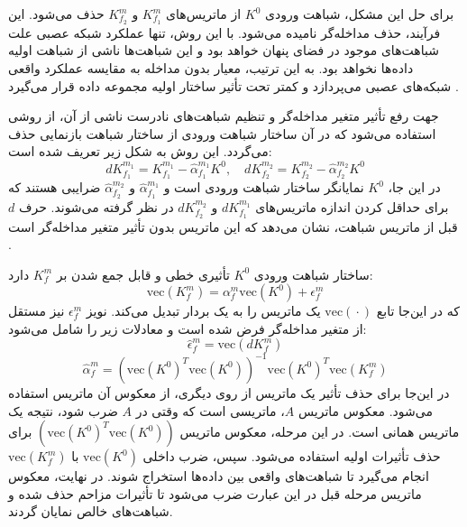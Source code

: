 برای حل این مشکل، شباهت ورودی \(K^0\) از ماتریس‌های \(K^{m}_{f_1}\) و \(K^{m}_{f_2}\) حذف می‌شود. این فرآیند، حذف مداخله‌گر نامیده می‌شود. با این روش، تنها عملکرد شبکه عصبی علت شباهت‌های موجود در فضای پنهان خواهد بود و این شباهت‌ها ناشی از شباهت اولیه داده‌ها نخواهد بود. به این ترتیب، معیار بدون مداخله به مقایسه عملکرد واقعی شبکه‌های عصبی می‌پردازد و کمتر تحت تأثیر ساختار اولیه مجموعه داده قرار می‌گیرد
\cite{cui2022deconfounded}.


جهت رفع تأثیر متغیر مداخله‌گر و تنظیم شباهت‌های نادرست ناشی از آن، از روشی استفاده می‌شود که در آن ساختار شباهت ورودی از ساختار شباهت بازنمایی حذف می‌گردد. این روش به شکل زیر تعریف شده است:
\begin{equation}
 dK^{m_1}_{f_1} = K^{m_1}_{f_1} - \hat{\alpha}^{m_1}_{f_1} K^0,  \quad
dK^{m_2}_{f_2} = K^{m_2}_{f_2} - \hat{\alpha}^{m_2}_{f_2} K^0
\end{equation}
در این جا، \(K^0\) نمایانگر ساختار شباهت ورودی است و \(\hat{\alpha}^{m_1}_{f_1}\) و \(\hat{\alpha}^{m_2}_{f_2}\) ضرایبی هستند که برای حداقل کردن اندازه‌ ماتریس‌های \(dK^{m_1}_{f_1}\) و \(dK^{m_2}_{f_2}\) در نظر گرفته می‌شوند. حرف \(d\) قبل از ماتریس شباهت، نشان می‌دهد که این ماتریس بدون تأثیر متغیر مداخله‌گر است
\cite{cui2022deconfounded}.

ساختار شباهت ورودی \(K^0\) تأثیری خطی و قابل جمع شدن بر \(K^{m}_{f}\) دارد:
\begin{equation}
	\text{vec}(K^{m}_{f}) = \alpha^{m}_{f} \text{vec}(K^0) + \epsilon^{m}_{f}
\end{equation}
که در این‌جا تابع \(\text{vec}(‎\cdot)\) یک ماتریس را به یک بردار تبدیل می‌کند. نویز \(\epsilon^{m}_{f}\) نیز مستقل از متغیر مداخله‌گر فرض شده است و معادلات زیر را شامل می‌شود:
\begin{equation}
	\hat{\epsilon}^{m}_{f} = \text{vec}(dK^{m}_{f})
\end{equation}
\vspace{-34}
\begin{equation}
	\hat{\alpha}^{m}_{f} = (\text{vec}(K^0)^T \text{vec}(K^0))^{-1} \text{vec}(K^0)^T \text{vec}(K^{m}_{f})
\end{equation}
در این‌جا برای حذف تأثیر یک ماتریس از روی دیگری، از معکوس آن ماتریس استفاده می‌شود. معکوس ماتریس \(A\)، ماتریسی است که وقتی در \(A\) ضرب شود، نتیجه یک ماتریس همانی%
است.
در این مرحله، معکوس ماتریس \((\text{vec}(K^0)^T \text{vec}(K^0))\) برای حذف تأثیرات اولیه استفاده می‌شود. سپس، ضرب داخلی \(\text{vec}(K^0)\) با \(\text{vec}(K^{m}_{f})\) انجام می‌گیرد تا شباهت‌های واقعی بین داده‌ها استخراج شوند. در نهایت، معکوس ماتریس مرحله قبل در این عبارت ضرب می‌شود تا تأثیرات مزاحم حذف شده و شباهت‌های خالص نمایان گردند.


